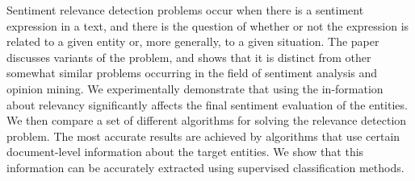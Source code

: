 Sentiment relevance detection problems occur when there is a sentiment expression in a text, and there is the question of whether or not the expression is related to a given entity or, more generally, to a given situation. The paper discusses variants of the problem, and shows that it is distinct from other somewhat similar problems occurring in the field of sentiment analysis and opinion mining. We experimentally demonstrate that using the in-formation about relevancy significantly affects the final sentiment evaluation of the entities. We then compare a set of different algorithms for solving the relevance detection problem. The most accurate results are achieved by algorithms that use certain document-level information about the target entities. We show that this information can be accurately extracted using supervised classification methods.
